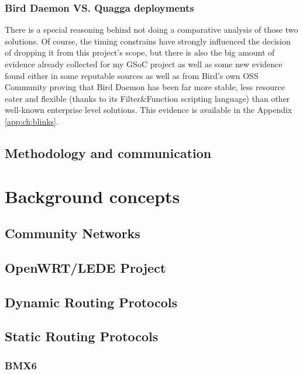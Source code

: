 \subsubsection{Bird Daemon VS. Quagga deployments}
There is a special reasoning behind not doing a comparative analysis of those two solutions. Of course, the timing constrains have strongly influenced the decision of dropping it from this project's scope, but there is also the big amount of evidence already collected for my GSoC project as well as some new evidence found either in some reputable sources as well as from Bird's own OSS Community proving that Bird Daemon has been far more stable, less resource eater and flexible (thanks to its Filter\&Function scripting language) than other well-known enterprise level solutions. This evidence is available in the Appendix \ref{app:ch:blinks}.


\subsection{Methodology and communication}



\section{Background concepts}
\label{sec:backc}

\subsection{Community Networks}
\label{subsec:cn}

\subsection{OpenWRT/LEDE Project}
\label{subsec:owrtlp}


\subsection{Dynamic Routing Protocols}
\label{subsec:drp}


\subsection{Static Routing Protocols}
\label{subsec:srp}


\subsubsection{BMX6}
\label{subsec:bmx}



